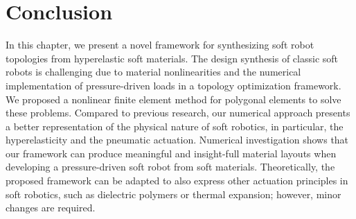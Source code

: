 \section{Conclusion}
In this chapter, we present a novel framework for synthesizing soft robot topologies from hyperelastic soft materials. The design synthesis of classic soft robots is challenging due to material nonlinearities and the numerical implementation of pressure-driven loads in a topology optimization framework. We proposed a nonlinear finite element method for polygonal elements to solve these problems. Compared to previous research, our numerical approach presents a better representation of the physical nature of soft robotics, in particular, the hyperelasticity and the pneumatic actuation. Numerical investigation shows that our framework can produce meaningful and insight-full material layouts when developing a pressure-driven soft robot from soft materials. Theoretically, the proposed framework can be adapted to also express other actuation principles in soft robotics, such as dielectric polymers or thermal expansion; however, minor changes are required. 